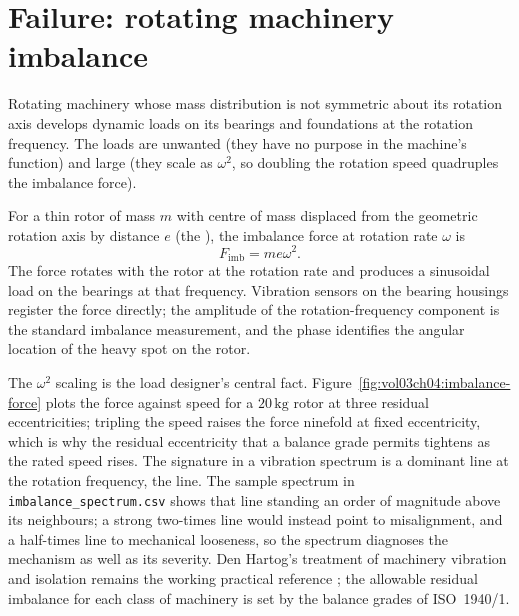 \section{Failure: rotating machinery imbalance}

Rotating machinery whose mass distribution is not symmetric about
its rotation axis develops dynamic loads on its bearings and
foundations at the rotation frequency. The loads are unwanted (they
have no purpose in the machine's function) and large (they scale as
$\omega^2$, so doubling the rotation speed quadruples the imbalance
force).

For a thin rotor of mass $m$ with centre of mass displaced from the
geometric rotation axis by distance $e$ (the ),
the imbalance force at rotation rate $\omega$ is
\[
F_{\text{imb}} = m e \omega^2.
\]
The force rotates with the rotor at the rotation rate and produces
a sinusoidal load on the bearings at that frequency. Vibration
sensors on the bearing housings register the force directly; the
amplitude of the rotation-frequency component is the standard
imbalance measurement, and the phase identifies the angular location
of the heavy spot on the rotor.



The $\omega^{2}$ scaling is the load designer's central fact.
Figure~\ref{fig:vol03ch04:imbalance-force} plots the force against
speed for a $20\,\si{\kilogram}$ rotor at three residual
eccentricities; tripling the speed raises the force ninefold at fixed
eccentricity, which is why the residual eccentricity that a balance
grade permits tightens as the rated speed rises. The signature in a
vibration spectrum is a dominant line at the rotation frequency, the
 line. The sample spectrum in
\texttt{imbalance\_spectrum.csv} shows that line standing an order of
magnitude above its neighbours; a strong two-times line would instead
point to misalignment, and a half-times line to mechanical looseness,
so the spectrum diagnoses the mechanism as well as its severity. Den
Hartog's treatment of machinery vibration and isolation remains the
working practical reference \cite{text:den-hartog-vibrations}; the
allowable residual imbalance for each class of machinery is set by the
balance grades of ISO~1940/1.

